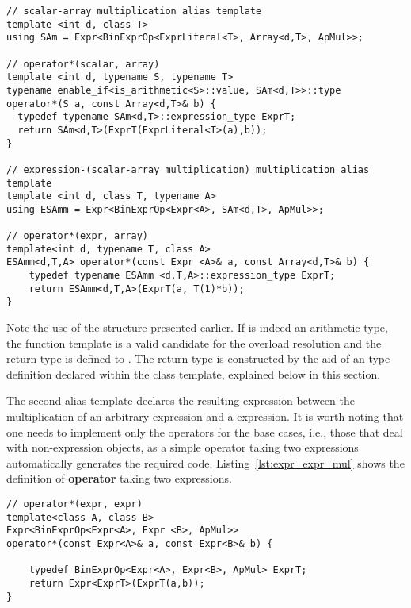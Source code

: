 \documentclass[11pt]{article}
\newcommand{\code}[1]{{\footnotesize\ttfamily{#1}}}
\newcommand\keywordd[1]{{\color{DarkOrchid}\footnotesize\ttfamily\textbf{#1}}}
\begin{document}
\begin{lstlisting}[caption={Overloaded operators}, label=lst:expr_operators]
// scalar-array multiplication alias template
template <int d, class T>
using SAm = Expr<BinExprOp<ExprLiteral<T>, Array<d,T>, ApMul>>;
  
// operator*(scalar, array)
template <int d, typename S, typename T>
typename enable_if<is_arithmetic<S>::value, SAm<d,T>>::type
operator*(S a, const Array<d,T>& b) {
  typedef typename SAm<d,T>::expression_type ExprT;
  return SAm<d,T>(ExprT(ExprLiteral<T>(a),b));
}

// expression-(scalar-array multiplication) multiplication alias template
template <int d, class T, typename A>
using ESAmm = Expr<BinExprOp<Expr<A>, SAm<d,T>, ApMul>>;
    
// operator*(expr, array)
template<int d, typename T, class A>
ESAmm<d,T,A> operator*(const Expr <A>& a, const Array<d,T>& b) {    
    typedef typename ESAmm <d,T,A>::expression_type ExprT;
    return ESAmm<d,T,A>(ExprT(a, T(1)*b));
}
\end{lstlisting}
Note the use of the \code{enable\_if} structure presented earlier. If \code{S} is indeed an arithmetic type, the function template is a valid candidate for the overload resolution and the return type is defined to \code{SAm<d,T>}. The return type is constructed by the aid of an \code{expression\_type} type definition declared within the \code{Expr} class template, explained below in this section. 

The second alias template declares the resulting expression between the multiplication of an arbitrary expression and a \code{SAm<d,T>} expression.
 It is worth noting that one needs to implement only the operators for the base cases, i.e., those that deal with non-expression objects, as a simple operator taking two expressions automatically generates the required code. Listing~\ref{lst:expr_expr_mul} shows the definition of \keywordd{operator}\code{*} taking two expressions.
\begin{lstlisting}[caption={Overloaded multiplication operator for two expressions}, label=lst:expr_expr_mul]
// operator*(expr, expr)
template<class A, class B>
Expr<BinExprOp<Expr<A>, Expr <B>, ApMul>>
operator*(const Expr<A>& a, const Expr<B>& b) {
    
    typedef BinExprOp<Expr<A>, Expr<B>, ApMul> ExprT;
    return Expr<ExprT>(ExprT(a,b));
}
\end{lstlisting}
\end{document}

